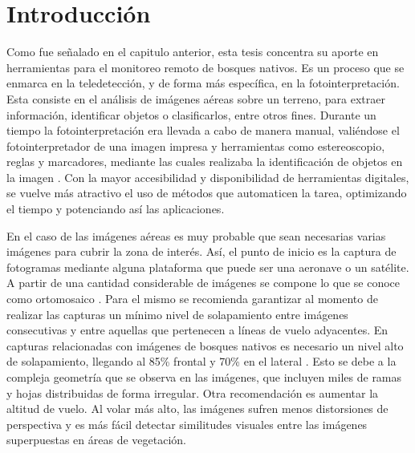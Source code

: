\section{Introducción}
Como fue señalado en el capitulo anterior, esta tesis concentra su aporte en herramientas para el monitoreo remoto de bosques nativos.
Es un proceso que se enmarca en la teledetección, y de forma más específica, en la fotointerpretación. Esta consiste en el análisis de imágenes aéreas sobre un terreno, para extraer información, identificar objetos o clasificarlos, entre otros fines. 
Durante un tiempo la fotointerpretación era llevada a cabo de manera manual, valiéndose el fotointerpretador de una imagen impresa y herramientas como estereoscopio, reglas y marcadores, mediante las cuales realizaba la identificación de objetos en la imagen \cite{noauthor_teledeteccion_nodate,hernandez_tecnologias_2011,garcia_introduccion_nodate}. Con la mayor accesibilidad y disponibilidad de herramientas digitales, se vuelve más atractivo el uso de métodos que automaticen la tarea, optimizando el tiempo y potenciando así las aplicaciones.

En el caso de las imágenes aéreas es muy probable que sean necesarias varias imágenes para cubrir la zona de interés. Así, el punto de inicio es la captura de fotogramas mediante alguna plataforma que puede ser una aeronave o un satélite. A partir de una cantidad considerable de imágenes se compone lo que se conoce como ortomosaico \cite{liba_accuracy_2015}. Para el mismo se recomienda garantizar al momento de realizar las capturas  un mínimo nivel de solapamiento entre imágenes consecutivas y entre aquellas que pertenecen a líneas de vuelo adyacentes. En capturas relacionadas con imágenes de bosques nativos es necesario un nivel alto de solapamiento, llegando al 85\% frontal y 70\% en el lateral \cite{sestari_rpas_2019}. Esto se debe a la compleja geometría que se observa en las imágenes, que incluyen miles de ramas y hojas distribuidas de forma irregular. Otra recomendación es aumentar la altitud de vuelo. Al volar más alto, las imágenes sufren menos distorsiones de perspectiva y es más fácil detectar similitudes visuales entre las imágenes superpuestas en áreas de vegetación.

